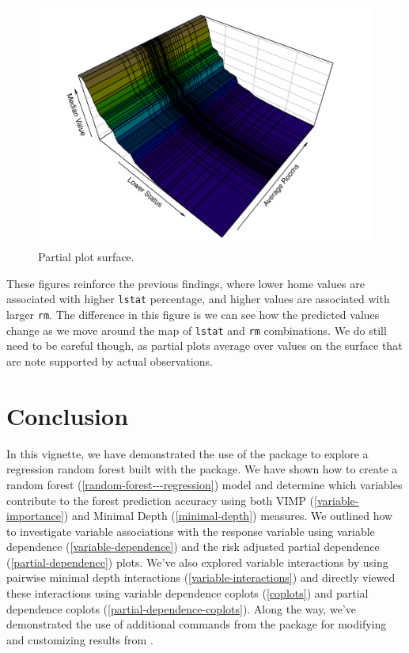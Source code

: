 \documentclass[article]{jss}
\begin{document}
\begin{CodeChunk}
\begin{figure}

{\centering \includegraphics{Regression-rfsrc_files/figure-latex/surface3d-1} 

}

\caption[Partial plot surface]{Partial plot surface.}\label{fig:surface3d}
\end{figure}
\end{CodeChunk}

These figures reinforce the previous findings, where lower home values
are associated with higher \texttt{lstat} percentage, and higher values
are associated with larger \texttt{rm}. The difference in this figure is
we can see how the predicted values change as we move around the map of
\texttt{lstat} and \texttt{rm} combinations. We do still need to be
careful though, as partial plots average over values on the surface that
are note supported by actual observations.

\hypertarget{conclusion}{%
\section{Conclusion}\label{conclusion}}

In this vignette, we have demonstrated the use of the
 package to explore a regression random forest
built with the  package. We have shown how to
create a random forest (\autoref{random-forest---regression}) model and
determine which variables contribute to the forest prediction accuracy
using both VIMP (\autoref{variable-importance}) and Minimal Depth
(\autoref{minimal-depth}) measures. We outlined how to investigate
variable associations with the response variable using variable
dependence (\autoref{variable-dependence}) and the risk adjusted partial
dependence (\autoref{partial-dependence}) plots. We've also explored
variable interactions by using pairwise minimal depth interactions
(\autoref{variable-interactions}) and directly viewed these interactions
using variable dependence coplots (\autoref{coplots}) and partial
dependence coplots (\autoref{partial-dependence-coplots}). Along the
way, we've demonstrated the use of additional commands from the
 package for modifying and customizing results from
.

\renewcommand\refname{References}

\end{document}
